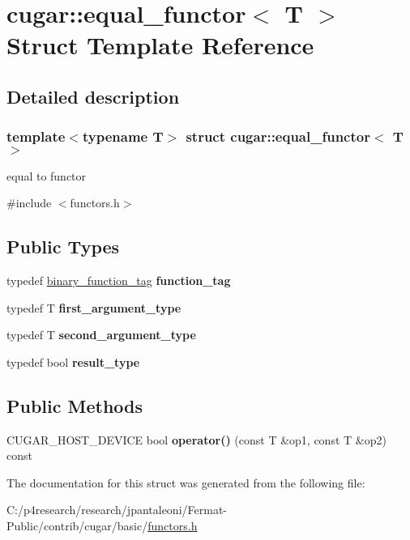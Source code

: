 \hypertarget{structcugar_1_1equal__functor}{}\section{cugar\+:\+:equal\+\_\+functor$<$ T $>$ Struct Template Reference}
\label{structcugar_1_1equal__functor}


\subsection{Detailed description}
\subsubsection*{template$<$typename T$>$\newline
struct cugar\+::equal\+\_\+functor$<$ T $>$}

equal to functor 

{\ttfamily \#include $<$functors.\+h$>$}

\subsection*{Public Types}
\begin{DoxyCompactItemize}
\item 
\mbox{\label{structcugar_1_1equal__functor_a22fc5b21fef69b944bc4a342de9e12f9}} 
typedef \hyperlink{structcugar_1_1binary__function__tag}{binary\+\_\+function\+\_\+tag} {\bfseries function\+\_\+tag}
\item 
\mbox{\label{structcugar_1_1equal__functor_a0afcdd3f576151df76f4fd5e1d3a27e0}} 
typedef T {\bfseries first\+\_\+argument\+\_\+type}
\item 
\mbox{\label{structcugar_1_1equal__functor_a1ad7f2a53c8aacd56de2a20f19dc808f}} 
typedef T {\bfseries second\+\_\+argument\+\_\+type}
\item 
\mbox{\label{structcugar_1_1equal__functor_a06c32ac0d18c2347f2c588a3217d4426}} 
typedef bool {\bfseries result\+\_\+type}
\end{DoxyCompactItemize}
\subsection*{Public Methods}
\begin{DoxyCompactItemize}
\item 
\mbox{\label{structcugar_1_1equal__functor_a2ea67afc9455aa6cc02e28366fea0aa1}} 
C\+U\+G\+A\+R\+\_\+\+H\+O\+S\+T\+\_\+\+D\+E\+V\+I\+CE bool {\bfseries operator()} (const T \&op1, const T \&op2) const
\end{DoxyCompactItemize}


The documentation for this struct was generated from the following file\+:\begin{DoxyCompactItemize}
\item 
C\+:/p4research/research/jpantaleoni/\+Fermat-\/\+Public/contrib/cugar/basic/\hyperlink{functors_8h}{functors.\+h}\end{DoxyCompactItemize}
